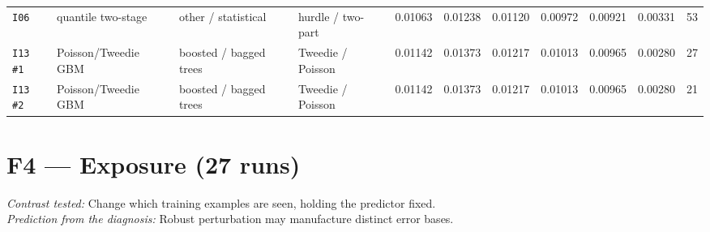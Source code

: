\documentclass[9pt,landscape]{article}
\begin{document}
\begin{longtable}{@{}p{1.1cm}p{5.4cm}p{3.1cm}p{2.7cm}rrrrrrr@{}}
\texttt{I06} & quantile two-stage & other / statistical & hurdle / two-part & 0.01063 & 0.01238 & 0.01120 & 0.00972 & 0.00921 & 0.00331 & 53 \\
\texttt{I13 \#1} & Poisson/Tweedie GBM & boosted / bagged trees & Tweedie / Poisson & 0.01142 & 0.01373 & 0.01217 & 0.01013 & 0.00965 & 0.00280 & 27 \\
\texttt{I13 \#2} & Poisson/Tweedie GBM & boosted / bagged trees & Tweedie / Poisson & 0.01142 & 0.01373 & 0.01217 & 0.01013 & 0.00965 & 0.00280 & 21 \\
\bottomrule\end{longtable}

\section*{F4 --- Exposure (27 runs)}
\noindent\emph{Contrast tested:} Change which training examples are seen, holding the predictor fixed.\\
\emph{Prediction from the diagnosis:} Robust perturbation may manufacture distinct error bases.
\vspace{2pt}
\end{document}
